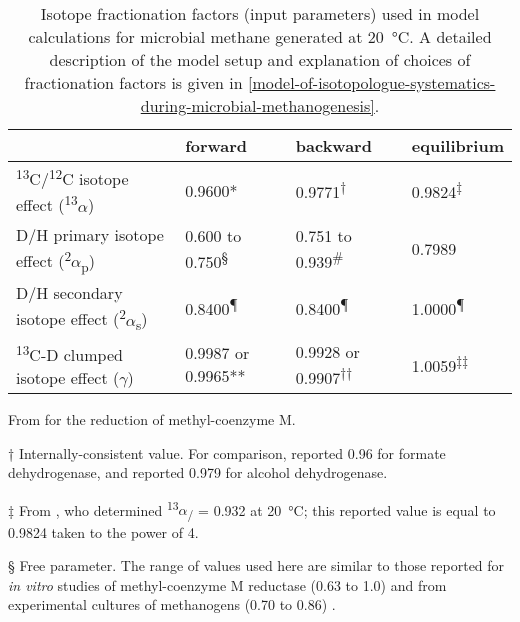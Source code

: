 \begin{table}\centering
	
	\caption[Isotope fractionation factors used
in model calculations for microbial methane]{Isotope fractionation factors (input parameters) used
		in model calculations for microbial methane generated at 20~°C. A
		detailed description of the model setup and explanation of choices of
		fractionation factors is given in \autoref{model-of-isotopologue-systematics-during-microbial-methanogenesis}.}
	\label{tab:2:S3}
	
	\begin{threeparttable}

		
		\small
		\begin{tabular}{llll}
			\toprule
			& forward & backward & equilibrium\tabularnewline
			\midrule
			\textsuperscript{13}C/\textsuperscript{12}C isotope effect
			(\textsuperscript{13}$\alpha$) & 0.9600* & 0.9771\textsuperscript{†} &
			0.9824\textsuperscript{‡}\tabularnewline
			D/H primary isotope effect (\textsuperscript{2}$\alpha$\textsubscript{p}) &
			0.600 to 0.750\textsuperscript{§} & 0.751 to 0.939\textsuperscript{\#} &
			0.7989\textsuperscript{\textbar{}\textbar{}}\tabularnewline
			D/H secondary isotope effect (\textsuperscript{2}$\alpha$\textsubscript{s}) &
			0.8400\textsuperscript{¶} & 0.8400\textsuperscript{¶} &
			1.0000\textsuperscript{¶}\tabularnewline
			\textsuperscript{13}C-D clumped isotope effect ($\gamma$) & 0.9987 or 0.9965**
			& 0.9928 or 0.9907\textsuperscript{††} &
			1.0059\textsuperscript{‡‡}\tabularnewline
			\bottomrule
		\end{tabular}
		
		\begin{tablenotes}
			\item * From \textcite{Scheller++_2013_JACS_KIE} for the reduction of methyl-coenzyme
			M.
			
			\item † Internally-consistent value. For comparison, \textcite{Hermes++_1984_Bc}
			 reported 0.96 for formate dehydrogenase, and \textcite{Scharschmidt++_1984_Bc} reported 0.979 for alcohol dehydrogenase.
			
			\item ‡ From \textcite{Horita_2001_GCA}, who determined
			\textsuperscript{13}$\alpha$\textsubscript{/} = 0.932 at 20~°C; this
			reported value is equal to 0.9824 taken to the power of 4.
			
			\item § Free parameter. The range of values used here are similar to those
			reported for \emph{in vitro} studies of methyl-coenzyme M reductase
			(0.63 to 1.0) \parencite{Scheller++_2013_JACS_KIE} and from experimental cultures of methanogens
			(0.70 to 0.86) \parencite{Valentine++_2004_GCA}.
			

\end{tablenotes}
\end{threeparttable}
\end{table}
